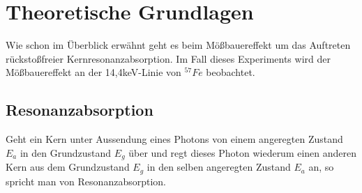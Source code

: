 \documentclass[12pt]{article}
\begin{document}
\section{Theoretische Grundlagen}
Wie schon im Überblick erwähnt geht es beim Mößbauereffekt um das Auftreten rückstoßfreier Kernresonanzabsorption.
Im Fall dieses Experiments wird der Mößbauereffekt an der 14,4keV-Linie von $^{57}Fe$ beobachtet. 

\subsection{Resonanzabsorption}
Geht ein Kern unter Aussendung eines Photons von einem angeregten Zustand $E_a$ in den Grundzustand $E_g$ über und regt dieses Photon
wiederum einen anderen Kern aus dem
Grundzustand $E_g$ in den selben angeregten Zustand $E_a$ an, so spricht man von Resonanzabsorption.
\end{document}
